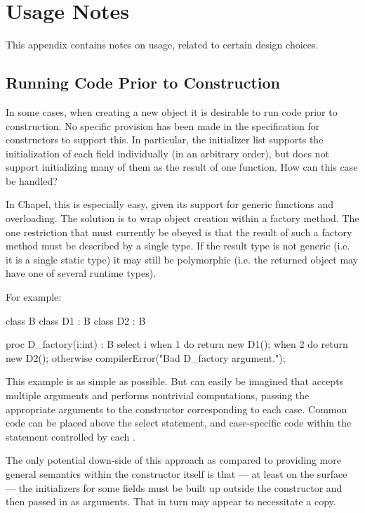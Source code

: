 \section{Usage Notes}

This appendix contains notes on usage, related to certain design choices.

\subsection{Running Code Prior to Construction}


In some cases, when creating a new object it is desirable to run code prior to
construction.  No specific provision has been made in the specification for constructors
to support this.  In particular, the initializer list supports the initialization of each
field individually (in an arbitrary order), but does not support initializing many of them
as the result of one function.  How can this case be handled?

In Chapel, this is especially easy, given its support for generic functions and
overloading.  The solution is to wrap object creation within a factory method.  The one
restriction that must currently be obeyed is that the result of such a factory method must
be described by a single type.  If the result type is not generic (i.e. it is a single
static type) it may still be polymorphic (i.e. the returned object may have one of several
runtime types).  

For example:
\begin{chapel}
class B { }
class D1 : B { }
class D2 : B { }

proc D_factory(i:int) : B {
  select i {
    when 1 do return new D1();
    when 2 do return new D2();
    otherwise compilerError("Bad D_factory argument.");
  }
}
\end{chapel}
\noindent
This example is as simple as possible.  But can easily be imagined that 
accepts multiple arguments and performs nontrivial computations, passing the appropriate
arguments to the constructor corresponding to each case.  Common code can be placed above
the select statement, and case-specific code within the statement controlled by each
.

The only potential down-side of this approach as compared to providing more general
semantics within the constructor itself is that --- at least on the surface --- the
initializers for some fields must be built up outside the constructor and then passed in
as arguments.  That in turn may appear to necessitate a copy.  

